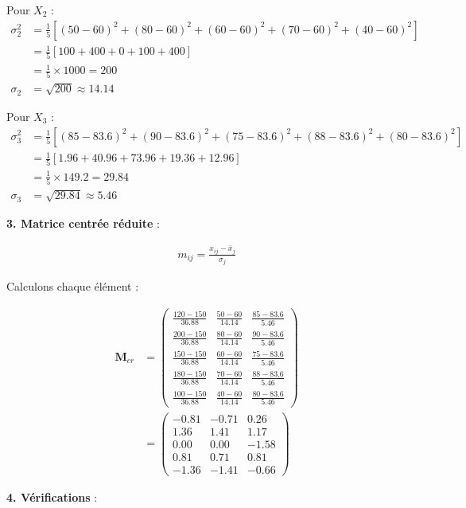 \documentclass[11pt,a4paper]{article}
\begin{document}
Pour $X_2$ :
\begin{align*}
\sigma_2^2 &= \frac{1}{5}[(50-60)^2 + (80-60)^2 + (60-60)^2 + (70-60)^2 + (40-60)^2] \\
&= \frac{1}{5}[100 + 400 + 0 + 100 + 400] \\
&= \frac{1}{5} \times 1000 = 200 \\
\sigma_2 &= \sqrt{200} \approx 14.14
\end{align*}

Pour $X_3$ :
\begin{align*}
\sigma_3^2 &= \frac{1}{5}[(85-83.6)^2 + (90-83.6)^2 + (75-83.6)^2 + (88-83.6)^2 + (80-83.6)^2] \\
&= \frac{1}{5}[1.96 + 40.96 + 73.96 + 19.36 + 12.96] \\
&= \frac{1}{5} \times 149.2 = 29.84 \\
\sigma_3 &= \sqrt{29.84} \approx 5.46
\end{align*}

\textbf{3. Matrice centrée réduite} :

\begin{align*}
m_{ij} = \frac{x_{ij} - \bar{x}_j}{\sigma_j}
\end{align*}

Calculons chaque élément :

\begin{align*}
\mathbf{M}_{cr} &= \begin{pmatrix}
\frac{120-150}{36.88} & \frac{50-60}{14.14} & \frac{85-83.6}{5.46} \\
\frac{200-150}{36.88} & \frac{80-60}{14.14} & \frac{90-83.6}{5.46} \\
\frac{150-150}{36.88} & \frac{60-60}{14.14} & \frac{75-83.6}{5.46} \\
\frac{180-150}{36.88} & \frac{70-60}{14.14} & \frac{88-83.6}{5.46} \\
\frac{100-150}{36.88} & \frac{40-60}{14.14} & \frac{80-83.6}{5.46}
\end{pmatrix} \\
&= \begin{pmatrix}
-0.81 & -0.71 & 0.26 \\
1.36 & 1.41 & 1.17 \\
0.00 & 0.00 & -1.58 \\
0.81 & 0.71 & 0.81 \\
-1.36 & -1.41 & -0.66
\end{pmatrix}
\end{align*}

\textbf{4. Vérifications} :
\end{document}
